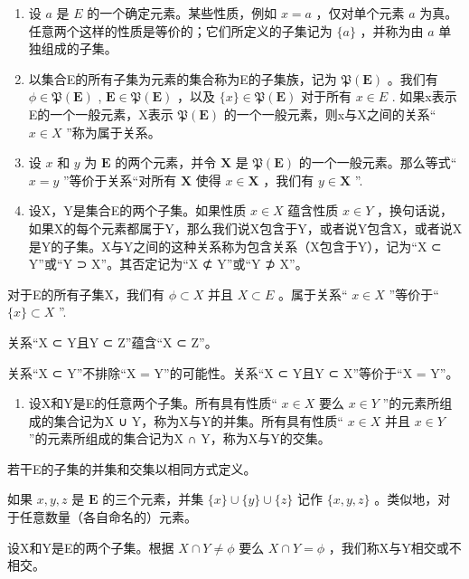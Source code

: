 \begin{enumerate}
\def\labelenumi{\arabic{enumi}.}
\setcounter{enumi}{8}
\item
  设 \(a\) 是 \(E\) 的一个确定元素。某些性质，例如 \(x = a\) ，仅对单个元素 \(a\) 为真。任意两个这样的性质是等价的；它们所定义的子集记为 \(\{a\}\) ，并称为由 \(a\) 单独组成的子集。
\item
  以集合E的所有子集为元素的集合称为E的子集族，记为 \(\mathfrak{P}(\mathbf{E})\) 。我们有 \(\phi \in \mathfrak{P}(\mathbf{E})\) , \(\mathbf{E} \in \mathfrak{P}(\mathbf{E})\) ，以及 \(\{x\} \in \mathfrak{P}(\mathbf{E})\) 对于所有 \(x \in E\) . 如果x表示E的一个一般元素，X表示 \(\mathfrak{P}(\mathbf{E})\) 的一个一般元素，则x与X之间的关系“ \(x \in X\) ”称为属于关系。
\item
  设 \(x\) 和 \(y\) 为 \(\mathbf{E}\) 的两个元素，并令 \(\mathbf{X}\) 是 \(\mathfrak{P}(\mathbf{E})\) 的一个一般元素。那么等式“ \(x = y\) ”等价于关系“对所有 \(\mathbf{X}\) 使得 \(x \in \mathbf{X}\) ，我们有 \(y \in \mathbf{X}\) ''.
\item
  设X，Y是集合E的两个子集。如果性质 \(x \in X\) 蕴含性质 \(x \in Y\) ，换句话说，如果X的每个元素都属于Y，那么我们说X包含于Y，或者说Y包含X，或者说X是Y的子集。X与Y之间的这种关系称为包含关系（X包含于Y），记为“X ⊂ Y”或“Y ⊃ X”。其否定记为“X ⊄ Y”或“Y ⊅ X”。
\end{enumerate}

对于E的所有子集X，我们有 \(\phi \subset X\) 并且 \(X \subset E\) 。属于关系“ \(x \in X\) ”等价于“ \(\{x\} \subset X\) ''.

关系“X ⊂ Y且Y ⊂ Z”蕴含“X ⊂ Z”。

关系“X ⊂ Y”不排除“X = Y”的可能性。关系“X ⊂ Y且Y ⊂ X”等价于“X = Y”。

\begin{enumerate}
\def\labelenumi{\arabic{enumi}.}
\setcounter{enumi}{12}
\tightlist
\item
  设X和Y是E的任意两个子集。所有具有性质“ \(x \in X\) 要么 \(x \in Y\) ”的元素所组成的集合记为X ∪ Y，称为X与Y的并集。所有具有性质“ \(x \in X\) 并且 \(x \in Y\) ”的元素所组成的集合记为X ∩ Y，称为X与Y的交集。
\end{enumerate}

若干E的子集的并集和交集以相同方式定义。

如果 \(x, y, z\) 是 \(\mathbf{E}\) 的三个元素，并集 \(\{x\} \cup \{y\} \cup \{z\}\) 记作 \(\{x, y, z\}\) 。类似地，对于任意数量（各自命名的）元素。

设X和Y是E的两个子集。根据 \(X \cap Y \neq \phi\) 要么 \(X \cap Y = \phi\) ，我们称X与Y相交或不相交。

